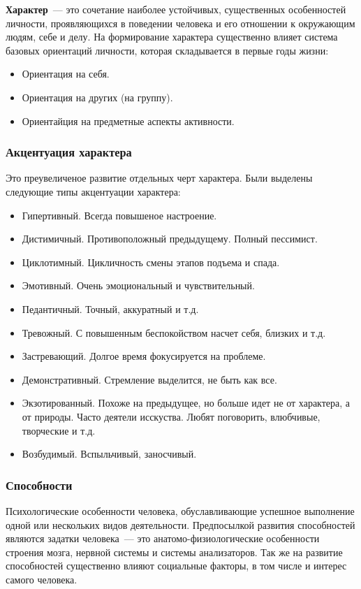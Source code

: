 \textbf{Характер}~--- это сочетание наиболее устойчивых, существенных особенностей личности, проявляющихся в поведении человека и его отношении к окружающим людям, себе и делу. На формирование характера существенно влияет система базовых ориентаций личности, которая складывается в первые годы жизни:
\begin{itemize}
	\item Ориентация на себя.
	\item Ориентация на других (на группу).
	\item Ориентайция на предметные аспекты активности.
\end{itemize}

\subsubsection{Акцентуация характера}
Это преувеличеное развитие отдельных черт характера. Были выделены следующие типы акцентуации характера:
\begin{itemize}
	\item Гипертивный. Всегда повышеное настроение.
	\item Дистимичный. Противоположный предыдущему. Полный пессимист.
	\item Циклотимный. Цикличность смены этапов подъема и спада.
	\item Эмотивный. Очень эмоциональный и чувствительный.
	\item Педантичный. Точный, аккуратный и т.д.
	\item Тревожный. С повышенным беспокойством насчет себя, близких и т.д.
	\item Застревающий. Долгое время фокусируется на проблеме.
	\item Демонстративный. Стремление выделится, не быть как все.
	\item Экзотированный. Похоже на предыдущее, но больше идет не от характера, а от природы. Часто деятели исскуства. Любят поговорить, влюбчивые, творческие и т.д.
	\item Возбудимый. Вспыльчивый, заносчивый.
\end{itemize}

\subsubsection{Способности}
Психологические особенности человека, обуславливающие успешное выполнение одной или нескольких видов деятельности. Предпосылкой развития способностей являются задатки человека~--- это анатомо-физиологические особенности строения мозга, нервной системы и системы анализаторов. Так же на развитие способностей существенно влияют социальные факторы, в том числе и интерес самого человека.

